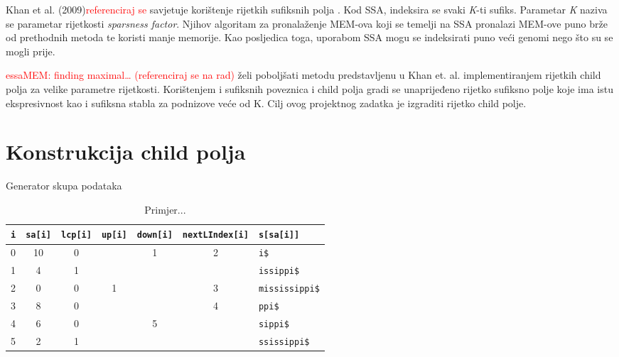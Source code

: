 \documentclass[times, utf8, seminar, numeric]{fer}
\newcommand\todo[1]{\textcolor{red}{#1}}
\begin{document}
Khan et al. (2009)\todo{referenciraj se} savjetuje korištenje rijetkih sufiksnih polja . Kod SSA, indeksira se svaki \textit{K}-ti sufiks. Parametar \textit{K} naziva se parametar rijetkosti \textit{sparsness factor}. Njihov algoritam za pronalaženje MEM-ova koji se temelji na SSA pronalazi MEM-ove puno brže od prethodnih metoda te koristi manje memorije. Kao posljedica toga, uporabom SSA mogu se indeksirati puno veći genomi nego što su se mogli prije.

\todo{essaMEM: finding maximal… (referenciraj se na rad)} želi poboljšati metodu predstavljenu u Khan et. al. implementiranjem rijetkih child polja za velike parametre rijetkosti. Korištenjem i sufiksnih poveznica  i child polja gradi se unaprijeđeno rijetko sufiksno polje  koje ima istu ekspresivnost kao i sufiksna stabla za podnizove veće od K. Cilj ovog projektnog zadatka je izgraditi rijetko child polje.

\chapter{Konstrukcija child polja}

\begin{algorithm}[h]
	\caption{Generator skupa podataka}
	\label{alg:generator}

	
\end{algorithm}

\begin{table}[h]
	\centering
	\caption{Primjer...}
	\label{tbl:example}
	
	\begin{tabular}{ccccccl}
		\hline
    \texttt{i} & \texttt{sa[i]} & \texttt{lcp[i]} & \texttt{up[i]} & \texttt{down[i]} & \texttt{nextLIndex[i]} & \texttt{s[sa[i]]} \\ \hline
    0 & 10 &  0 &    &  1 &  2 & \texttt{i\$}           \\
    1 &  4 &  1 &    &    &    & \texttt{issippi\$}     \\
    2 &  0 &  0 &  1 &    &  3 & \texttt{mississippi\$} \\
    3 &  8 &  0 &    &    &  4 & \texttt{ppi\$}         \\
    4 &  6 &  0 &    &  5 &    & \texttt{sippi\$}       \\
    5 &  2 &  1 &    &    &    & \texttt{ssissippi\$}   \\ \hline
	\end{tabular}
\end{table}
\end{document}
